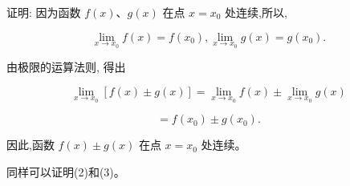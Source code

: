 \documentclass[lang=cn,newtx,12pt,scheme=chinese]{elegantbook}
\begin{document}
证明: 因为函数 \(f\left( x\right) \text{、}g\left( x\right)\) 在点 \(x = {x}_{0}\) 处连续,所以,

\[
\mathop{\lim }\limits_{{x \rightarrow {x}_{0}}}f\left( x\right) = f\left( {x}_{0}\right) ,\mathop{\lim }\limits_{{x \rightarrow {x}_{0}}}g\left( x\right) = g\left( {x}_{0}\right) .
\]

由极限的运算法则, 得出

\[
\mathop{\lim }\limits_{{x \rightarrow {x}_{0}}}\left\lbrack {f\left( x\right) \pm g\left( x\right) }\right\rbrack = \mathop{\lim }\limits_{{x \rightarrow {x}_{0}}}f\left( x\right) \pm \mathop{\lim }\limits_{{x \rightarrow {x}_{0}}}g\left( x\right)
\]

\[
= f\left( {x}_{0}\right) \pm g\left( {x}_{0}\right) \text{.}
\]

因此,函数 \(f\left( x\right) \pm g\left( x\right)\) 在点 \(x = {x}_{0}\) 处连续。

同样可以证明(2)和(3)。
\end{document}
